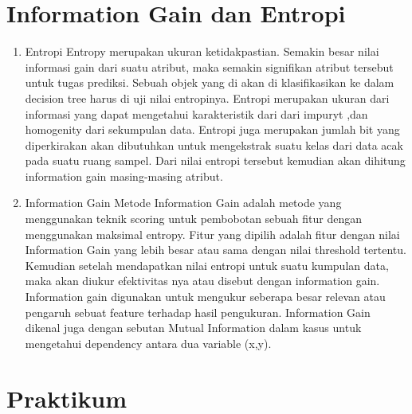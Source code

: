 	\section{Information Gain dan Entropi}
	\begin{enumerate}
	\item Entropi
	\newline  Entropy merupakan ukuran ketidakpastian. Semakin besar nilai informasi gain dari suatu atribut, maka semakin signifikan atribut tersebut untuk tugas prediksi. Sebuah objek yang di akan di klasifikasikan ke dalam decision tree harus di uji nilai entropinya. Entropi merupakan ukuran dari informasi yang dapat mengetahui karakteristik  dari dari impuryt ,dan homogenity dari sekumpulan data. Entropi juga merupakan jumlah bit yang diperkirakan akan dibutuhkan untuk mengekstrak suatu kelas dari data acak pada suatu ruang sampel. Dari nilai entropi tersebut kemudian akan dihitung information gain masing-masing atribut. 

	\item Information Gain
	\newline Metode Information Gain adalah metode yang menggunakan teknik scoring untuk pembobotan sebuah fitur dengan menggunakan maksimal entropy. Fitur yang dipilih adalah fitur dengan nilai Information Gain yang lebih besar atau sama dengan nilai threshold tertentu. Kemudian setelah mendapatkan nilai entropi untuk suatu kumpulan data, maka akan diukur efektivitas nya atau disebut dengan information gain. Information gain digunakan untuk mengukur seberapa besar relevan atau pengaruh sebuat feature terhadap hasil pengukuran. Information Gain dikenal juga dengan sebutan Mutual Information dalam kasus untuk mengetahui dependency antara dua variable (x,y).
	\end{enumerate}


\section{Praktikum}
